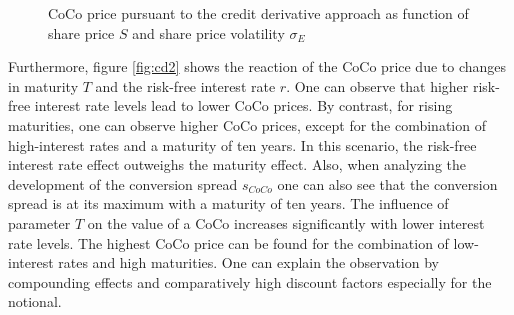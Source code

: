 \begin{figure}
\centering
{}
  \caption[CoCo price pursuant to the credit derivative approach as function of share price and share price volatility]{CoCo price pursuant to the credit derivative approach as function of share price $S$ and share price volatility $\sigma_E$}
  \label{fig:cd1}
  \end{figure}

Furthermore, figure \ref{fig:cd2} shows the reaction of the CoCo price due to changes in maturity $T$ and the risk-free interest rate $r$. One can observe that higher risk-free interest rate levels lead to lower CoCo prices. By contrast, for rising maturities, one can observe higher CoCo prices, except for the combination of high-interest rates and a maturity of ten years. In this scenario, the risk-free interest rate effect outweighs the maturity effect. Also, when analyzing the development of the conversion spread $s_{CoCo}$ one can also see that the conversion spread is at its maximum with a maturity of ten years. The influence of parameter $T$ on the value of a CoCo increases significantly with lower interest rate levels. The highest CoCo price can be found for the combination of low-interest rates and high maturities. One can explain the observation by compounding effects and comparatively high discount factors especially for the notional. \\
  
